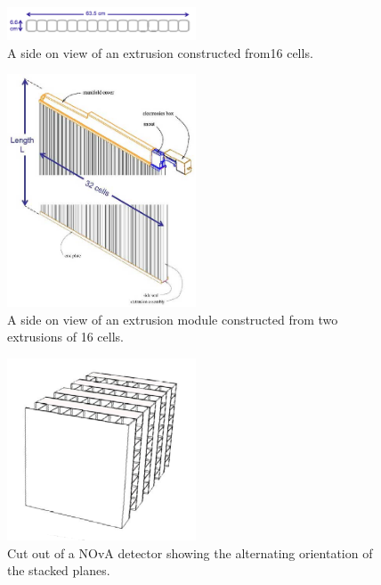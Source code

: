 \begin{figure}
  \centering
  \includegraphics[width=0.5\textwidth]{../../img/det/gen/extru_cross_section.png}
  \caption{A side on view of an extrusion constructed from16 cells.}
  \label{fig:extrusion}
\end{figure}

\begin{figure}
  \centering
  \includegraphics[width=0.5\textwidth]{../../img/det/gen/extrusionModule.jpg}
  \caption{A side on view of an extrusion module constructed from two
    extrusions of 16 cells. }
  \label{fig:module}
\end{figure}

\begin{figure}
  \centering
  \includegraphics[width=0.5\textwidth]{../../img/det/gen/planes.png}
  \caption{Cut out of a NOvA detector showing the alternating
    orientation of the stacked planes.}
  \label{fig:stackedPlanes}
\end{figure}


